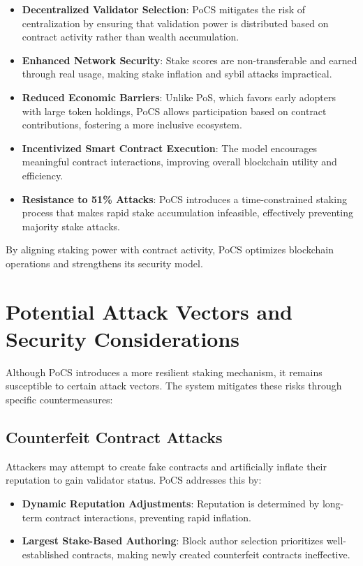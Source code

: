 \documentclass{article}
\begin{document}
\begin{itemize}
    \item \textbf{Decentralized Validator Selection}: PoCS mitigates the risk of centralization by ensuring that validation power is distributed based on contract activity rather than wealth accumulation.
    \item \textbf{Enhanced Network Security}: Stake scores are non-transferable and earned through real usage, making stake inflation and sybil attacks impractical.
    \item \textbf{Reduced Economic Barriers}: Unlike PoS, which favors early adopters with large token holdings, PoCS allows participation based on contract contributions, fostering a more inclusive ecosystem.
    \item \textbf{Incentivized Smart Contract Execution}: The model encourages meaningful contract interactions, improving overall blockchain utility and efficiency.
    \item \textbf{Resistance to 51\% Attacks}: PoCS introduces a time-constrained staking process that makes rapid stake accumulation infeasible, effectively preventing majority stake attacks.
\end{itemize}

By aligning staking power with contract activity, PoCS optimizes blockchain operations and strengthens its security model.

\section{Potential Attack Vectors and Security Considerations}

Although PoCS introduces a more resilient staking mechanism, it remains susceptible to certain attack vectors. The system mitigates these risks through specific countermeasures:

\subsection{Counterfeit Contract Attacks}

Attackers may attempt to create fake contracts and artificially inflate their reputation to gain validator status. PoCS addresses this by:

\begin{itemize}
    \item \textbf{Dynamic Reputation Adjustments}: Reputation is determined by long-term contract interactions, preventing rapid inflation.
    \item \textbf{Largest Stake-Based Authoring}: Block author selection prioritizes well-established contracts, making newly created counterfeit contracts ineffective.
\end{itemize}
\end{document}
